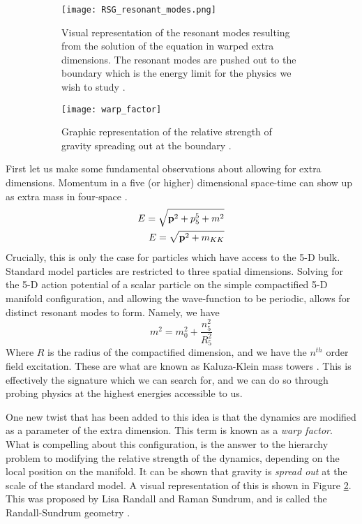 \documentclass[12pt]{article}
\begin{document}
\begin{figure}[t]
    \centering
    \begin{subfigure}[t]{.48\textwidth}
        \centering
        \texttt{[image: RSG\_resonant\_modes.png]}
        \caption{Visual representation of the resonant modes resulting from the
        solution of the equation in warped extra dimensions. The resonant modes
        are pushed out to the boundary which is the energy limit for the physics we
        wish to study \cite{bsm}.}
        \label{subfig:RSG_resonant_modes}
    \end{subfigure}
    \hfill
    \begin{subfigure}[t]{.48\textwidth}
        \centering
        \texttt{[image: warp\_factor]}
        \caption{Graphic representation of the relative strength of gravity
        spreading out at the boundary \cite{bsm}.}
        \label{subfig:warp_factor}
    \end{subfigure}
\caption{}
\label{fig:theoretical_motivation_figure}
\end{figure}

First let us make some fundamental observations about allowing for extra
dimensions. Momentum in a five (or higher) dimensional space-time can show up as
extra mass in four-space \cite{KALUZA_2018, bsm}. 
\begin{align}
    E = \sqrt{\vb{p}^2 + p_5^5 + m^2} \\
    E = \sqrt{\vb{p}^2 + m_{KK}}
\end{align}
Crucially, this is only the case for particles which have access to the 5-D
bulk. Standard model particles are restricted to three spatial dimensions.
Solving for the 5-D action potential of a scalar particle on the simple
compactified 5-D manifold configuration, and allowing the wave-function to be
periodic, allows for distinct resonant modes to form. Namely, we have
\begin{equation}
    m^2 = m_0^2 + \frac{n_5^2}{R_5^2}
\end{equation}
Where $R$ is the radius of the compactified dimension, and we have the $n^{th}$
order field excitation. These are what are known as Kaluza-Klein mass towers
\cite{KALUZA_2018, bsm}. This is effectively the signature which we can search
for, and we can do so through probing physics at the highest energies accessible
to us.

One new twist that has been added to this idea is that the dynamics are modified
as a parameter of the extra dimension. This term is known as a \textit{warp
factor}. What is compelling about this configuration, is the answer to the
hierarchy problem to modifying the relative strength of the dynamics, depending
on the local position on the manifold. It can be shown that gravity is
\textit{spread out} at the scale of the standard model. A visual
representation of this is shown in Figure \ref{subfig:warp_factor}. This was
proposed by Lisa Randall and Raman Sundrum, and is called the Randall-Sundrum
geometry \cite{RandallSundrumOriginal, bsm}.
\end{document}
